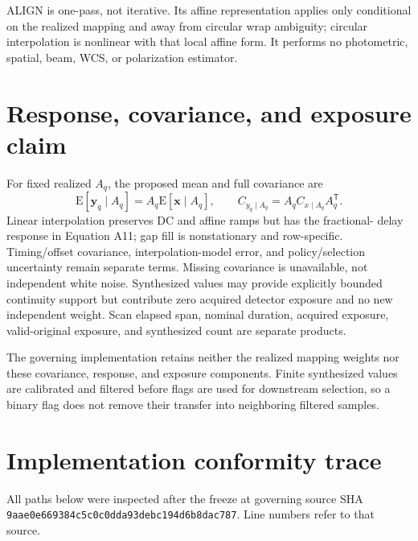 \documentclass[11pt]{article}
\newcommand{\code}[1]{\nolinkurl{#1}}
\newcommand{\Aeq}[1]{Equation A#1}
\newcommand{\AuditGoverningSHAPrint}{\code{9aae0e669384c5c0c0dd}\allowbreak\code{a93debc194d6b8dac787}}
\begin{document}
ALIGN is one-pass, not iterative.  Its affine representation applies only
conditional on the realized mapping and away from circular wrap ambiguity;
circular interpolation is nonlinear with that local affine form.  It performs
no photometric, spatial, beam, WCS, or polarization estimator.

\section{Response, covariance, and exposure claim}

For fixed realized $A_q$, the proposed mean and full covariance are
\[
 \mathrm{E}[\boldsymbol y_q\mid A_q]=A_q\mathrm{E}[\boldsymbol x\mid A_q],
 \qquad C_{y_q\mid A_q}=A_qC_{x\mid A_q}A_q^{\mathsf T}.
\]
Linear interpolation preserves DC and affine ramps but has the fractional-
delay response in \Aeq{11}; gap fill is nonstationary and row-specific.
Timing/offset covariance, interpolation-model error, and policy/selection
uncertainty remain separate terms.  Missing covariance is unavailable, not
independent white noise.  Synthesized values may provide explicitly bounded
continuity support but contribute zero acquired detector exposure and no new
independent weight.  Scan elapsed span, nominal duration, acquired exposure,
valid-original exposure, and synthesized count are separate products.

The governing implementation retains neither the realized mapping weights nor
these covariance, response, and exposure components.  Finite synthesized values are
calibrated and filtered before flags are used for downstream selection, so a
binary flag does not remove their transfer into neighboring filtered samples.

\section{Implementation conformity trace}

All paths below were inspected after the freeze at governing source SHA
\AuditGoverningSHAPrint.  Line numbers refer to that source.
\end{document}
